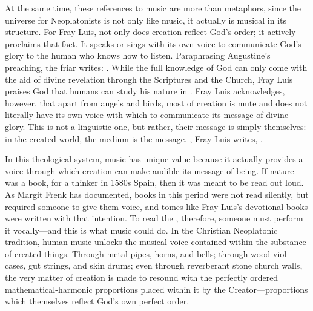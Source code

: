 At the same time, these references to music are more than metaphors, since the
universe for Neoplatonists is not only like music, it actually is musical in
its structure.
For Fray Luis, not only does creation reflect God's order; it actively
proclaims that fact.
It speaks or sings with its own voice to communicate God's glory to the human
who knows how to listen.
Paraphrasing Augustine's preaching, the friar writes: .%
    \Autocite[185, glossing Augustine's commentary on ]
    {LuisdeGranada:Simbolo} 
While the full knowledge of God can only come with the aid of divine revelation
through the Scriptures and the Church, Fray Luis praises God that humans can
study his nature in .%
    \Autocite[186]{LuisdeGranada:Simbolo}
Fray Luis acknowledges, however, that apart from angels and birds, most of
creation is mute and does not literally have its own voice with which to
communicate its message of divine glory.
This  is not a linguistic one, but rather, their message is
simply themselves: in the created world, the medium is the message.
, Fray Luis writes, .%
    \Autocite[192]{LuisdeGranada:Simbolo}

In this theological system, music has unique value because it actually provides
a voice through which creation can make audible its message-of-being.
If nature was a book, for a thinker in 1580s Spain, then it was meant to be
read out loud.
As Margit Frenk has documented, books in this period were not read silently,
but required someone to give them voice, and tomes like Fray Luis's devotional
books were written with that intention.%
    \Autocite{Frenk:Voz}
To read the , therefore, someone must perform it
vocally---and this is what music could do.
In the Christian Neoplatonic tradition, human music unlocks the musical voice
contained within the substance of created things.
Through metal pipes, horns, and bells; through wood viol cases, gut strings,
and skin drums; even through reverberant stone church walls, the very matter of
creation is made to resound with the perfectly ordered mathematical-harmonic
proportions placed within it by the Creator---proportions which themselves
reflect God's own perfect order.

